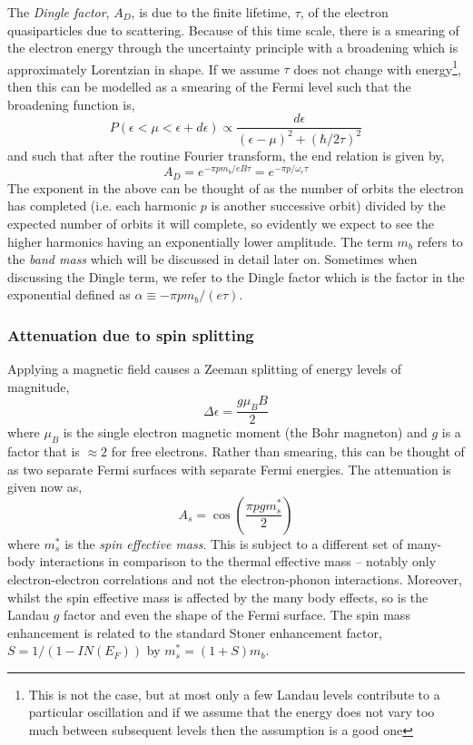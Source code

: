 The \emph{Dingle factor}, $A_D$, is due to the finite lifetime, $\tau$, of the electron quasiparticles due to scattering. Because of this time scale, there is a smearing of the electron energy through the uncertainty principle with a broadening which is approximately Lorentzian in shape. If we assume $\tau$ does not change with energy\footnote{This is not the case, but at most only a few Landau levels contribute to a particular oscillation and if we assume that the energy does not vary too much between subsequent levels then the assumption is a good one}, then this can be modelled as a smearing of the Fermi level such that the broadening function is,
\begin{equation}
  P(\epsilon < \mu < \epsilon + d\epsilon) \propto \frac{d\epsilon}{(\epsilon - \mu)^2 + (\hbar/2\tau)^2}
\end{equation}
and such that after the routine Fourier transform, the end relation is given by,
\begin{equation}
  A_D = e^{-\pi p m_b/e B\tau} = e^{-\pi p/\omega_c\tau} 
\label{Eqn:Theo:DingleTerm}
\end{equation}
The exponent in the above can be thought of as the number of orbits the electron has completed (i.e. each harmonic $p$ is another successive orbit) divided by the expected number of orbits it will complete, so evidently we expect to see the higher harmonics having an exponentially lower amplitude. The term $m_b$ refers to the \emph{band mass} which will be discussed in detail later on. Sometimes when discussing the Dingle term, we refer to the Dingle factor which is the factor in the exponential defined as $\alpha \equiv -\pi p m_b/(e \tau)$.

\subsubsection{Attenuation due to spin splitting}

Applying a magnetic field causes a Zeeman splitting of energy levels of magnitude,
\begin{equation}
  \Delta\epsilon = \frac{g \mu_B B}{2}
\end{equation}
where $\mu_B$ is the single electron magnetic moment (the Bohr magneton) and $g$ is a factor that is $\approx2$ for free electrons. Rather than smearing, this can be thought of as two separate Fermi surfaces with separate Fermi energies. The attenuation is given now as,
\begin{equation}
  A_s = \cos\left(\frac{\pi p g m^*_s}{2}\right)
\end{equation}
where $m^*_s$ is the \emph{spin effective mass}. This is subject to a different set of many-body interactions in comparison to the thermal effective mass -- notably only electron-electron correlations and not the electron-phonon interactions. Moreover, whilst the spin effective mass is affected by the many body effects, so is the Landau $g$ factor and even the shape of the Fermi surface. The spin mass enhancement is related to the standard Stoner enhancement factor, $S = 1/(1 - IN(E_F))$ by $m^*_s = (1 + S)m_b$.

